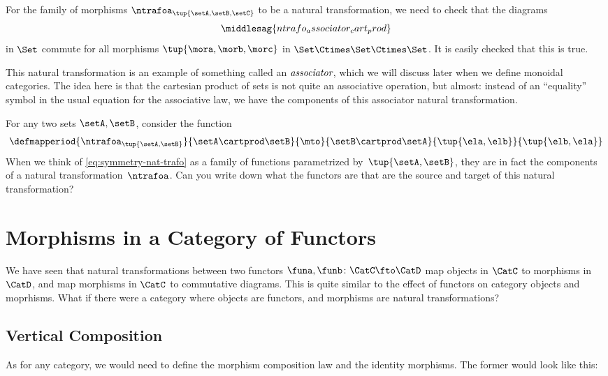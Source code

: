 \begin{example}
    For the family of morphisms $\ntrafoa_{\tup{\setA, \setB, \setC}}$ to be a natural transformation, we need to check that the diagrams
    \begin{equation}
        \label{eq:ntrafo_associator_cart_prod}
        \middlesag{ntrafo_associator_cart_prod}
    \end{equation}
    in $\Set$ commute for all morphisms $\tup{\mora, \morb, \morc}$ in $\Set \Ctimes \Set \Ctimes \Set$.
    It is easily checked that this is true.

    This natural transformation is an example of something called an $\emph{associator}$, which we will discuss later when we define monoidal categories.
    The idea here is that the cartesian product of sets is not quite an associative operation, but almost: instead of an ``equality'' symbol in the usual equation for the associative law, we have the components of this associator natural transformation.
\end{example}

\begin{example}
    For any two sets $\setA, \setB$, consider the function
    \begin{equation}\label{eq:symmetry-nat-trafo}
        \defmapperiod{\ntrafoa_{\tup{\setA, \setB}}}{\setA \cartprod \setB}{\mto }{\setB \cartprod \setA}{\tup{\ela, \elb}}{\tup{\elb, \ela}}
    \end{equation}
    When we think of \cref{eq:symmetry-nat-trafo} as a family of functions parametrized by~$\tup{\setA, \setB}$, they are in fact the components of a natural transformation~$\ntrafoa$.
    Can you write down what the functors are that are the source and target of this natural transformation?
\end{example}

\section{Morphisms in a Category of Functors}
We have seen that natural transformations between two functors $\funa, \funb \colon \CatC \fto \CatD$ map objects in $\CatC$ to
morphisms in $\CatD$, and map morphisms in $\CatC$ to commutative diagrams.
This is quite similar to the effect of functors on category
objects and moprhisms.
What if there were a category where objects are functors, and morphisms are natural transformations?

\subsection{Vertical Composition}
As for any category, we would need to define the morphism composition law and the identity morphisms.
The former would look like this:

